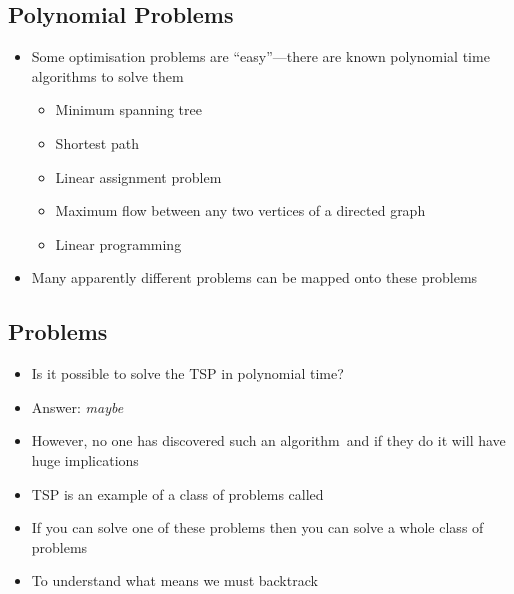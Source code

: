 \begin{slide}
\section{Polynomial Problems}

\begin{PauseHighLight}
  \begin{itemize}
  \item Some optimisation problems are ``easy''---there are known
    polynomial time algorithms to solve them\pause
    \begin{itemize}
    \item Minimum spanning tree
    \item Shortest path
    \item Linear assignment problem
    \item Maximum flow between any two vertices of a directed graph
    \item Linear programming\pause
    \end{itemize}
  \item Many apparently different problems can be mapped onto these
    problems\pause
  \end{itemize}
\end{PauseHighLight}

\end{slide}


\begin{slide}
\section[-1]{ Problems}

\begin{PauseHighLight}
  \begin{itemize}
  \item Is it possible to solve the TSP in polynomial time?\pause
  \item Answer:\pause{} \emph{maybe}\pauseb
  \item However, no one has discovered such an algorithm\pause\ and if they do
    it will have huge implications\pause
  \item TSP is an example of a class of problems called \pause
  \item If you can solve one of these problems then you can solve a whole
    class of problems\pause
  \item To understand what  means we must backtrack\pause 
  \end{itemize}
\end{PauseHighLight}

\end{slide}

